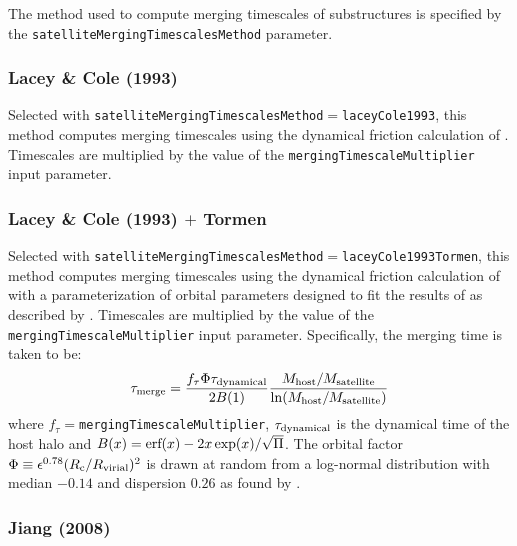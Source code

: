 The method used to compute merging timescales of substructures is specified by the {\tt satelliteMergingTimescalesMethod} parameter.

\subsubsection{Lacey \& Cole (1993)}\label{phys:satelliteMergingTimescales:satelliteMergingTimescalesLaceyCole1993}

Selected with {\tt satelliteMergingTimescalesMethod}$=${\tt laceyCole1993}, this method computes merging timescales using the dynamical friction calculation of \cite{lacey_merger_1993}. Timescales are multiplied by the value of the {\tt mergingTimescaleMultiplier} input parameter.

\subsubsection{Lacey \& Cole (1993) $+$ Tormen}\label{phys:satelliteMergingTimescales:satelliteMergingTimescalesLaceyCole1993Tormen}

Selected with {\tt satelliteMergingTimescalesMethod}$=${\tt laceyCole1993Tormen}, this method computes merging timescales using the dynamical friction calculation of \cite{lacey_merger_1993} with a parameterization of orbital parameters designed to fit the results of \cite{tormen_rise_1997} as described by \cite{cole_hierarchical_2000}. Timescales are multiplied by the value of the {\tt mergingTimescaleMultiplier} input parameter. Specifically, the merging time is taken to be:
\begin{equation}
 \tau_{\rm merge} = {f_\tau \Phi \tau_{\rm dynamical} \over 2 B(1)} { M_{\rm host}/M_{\rm satellite} \over \ln (M_{\rm host}/M_{\rm satellite})}
\end{equation}
where $f_\tau=${\tt mergingTimescaleMultiplier}, $\tau_{\rm dynamical}$ is the dynamical time of the host halo and $B(x)=\hbox{erf}(x)-2 x \exp(x)/\sqrt{\Pi}$. The orbital factor $\Phi \equiv \epsilon^{0.78} (R_{\rm c}/R_{\rm virial})^2$ is drawn at random from a log-normal distribution with median $-0.14$ and dispersion $0.26$ as found by \cite{cole_hierarchical_2000}.

\subsubsection{Jiang (2008)}\label{phys:satelliteMergingTimescales:satelliteMergingTimescalesJiang2008}

